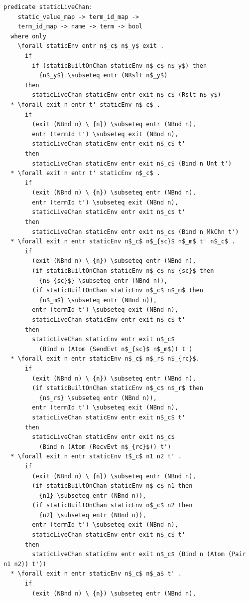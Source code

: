 \documentclass[letterpaper, 11pt]{extarticle}
\begin{document}
\begin{lstlisting}[language=logic, mathescape]
  predicate staticLiveChan:
    static_value_map -> term_id_map ->
    term_id_map -> name -> term -> bool
  where only
    \forall staticEnv entr n$_c$ n$_y$ exit .
      if
        if (staticBuiltOnChan staticEnv n$_c$ n$_y$) then
          {n$_y$} \subseteq entr (NRslt n$_y$)
      then
        staticLiveChan staticEnv entr exit n$_c$ (Rslt n$_y$)
  * \forall exit n entr t' staticEnv n$_c$ .
      if 
        (exit (NBnd n) \ {n}) \subseteq entr (NBnd n),
        entr (termId t') \subseteq exit (NBnd n),
        staticLiveChan staticEnv entr exit n$_c$ t'
      then 
        staticLiveChan staticEnv entr exit n$_c$ (Bind n Unt t')
  * \forall exit n entr t' staticEnv n$_c$ .
      if
        (exit (NBnd n) \ {n}) \subseteq entr (NBnd n),
        entr (termId t') \subseteq exit (NBnd n),
        staticLiveChan staticEnv entr exit n$_c$ t'
      then 
        staticLiveChan staticEnv entr exit n$_c$ (Bind n MkChn t')
  * \forall exit n entr staticEnv n$_c$ n$_{sc}$ n$_m$ t' n$_c$ .
      if
        (exit (NBnd n) \ {n}) \subseteq entr (NBnd n),
        (if staticBuiltOnChan staticEnv n$_c$ n$_{sc}$ then
          {n$_{sc}$} \subseteq entr (NBnd n)),
        (if staticBuiltOnChan staticEnv n$_c$ n$_m$ then 
          {n$_m$} \subseteq entr (NBnd n)),
        entr (termId t') \subseteq exit (NBnd n),
        staticLiveChan staticEnv entr exit n$_c$ t'
      then
        staticLiveChan staticEnv entr exit n$_c$
          (Bind n (Atom (SendEvt n$_{sc}$ n$_m$)) t')
  * \forall exit n entr staticEnv n$_c$ n$_r$ n$_{rc}$.    
      if
        (exit (NBnd n) \ {n}) \subseteq entr (NBnd n),
        (if staticBuiltOnChan staticEnv n$_c$ n$_r$ then
          {n$_r$} \subseteq entr (NBnd n)),
        entr (termId t') \subseteq exit (NBnd n),
        staticLiveChan staticEnv entr exit n$_c$ t'
      then
        staticLiveChan staticEnv entr exit n$_c$
          (Bind n (Atom (RecvEvt n$_{rc}$)) t')
  * \forall exit n entr staticEnv t$_c$ n1 n2 t' .
      if
        (exit (NBnd n) \ {n}) \subseteq entr (NBnd n),
        (if staticBuiltOnChan staticEnv n$_c$ n1 then
          {n1} \subseteq entr (NBnd n)),
        (if staticBuiltOnChan staticEnv n$_c$ n2 then
          {n2} \subseteq entr (NBnd n)),
        entr (termId t') \subseteq exit (NBnd n),
        staticLiveChan staticEnv entr exit n$_c$ t'
      then
        staticLiveChan staticEnv entr exit n$_c$ (Bind n (Atom (Pair n1 n2)) t'))
  * \forall exit n entr staticEnv n$_c$ n$_a$ t' . 
      if
        (exit (NBnd n) \ {n}) \subseteq entr (NBnd n),

\end{lstlisting}
\end{document}
